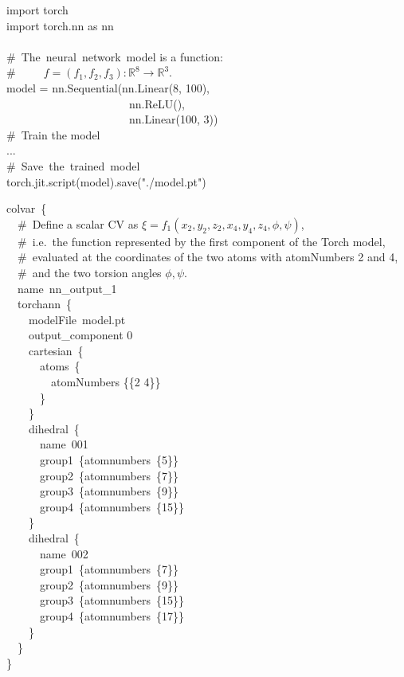 \begin{mdexampleinput}
\-import torch\\
\-import torch.nn as nn\\
\\
\-\#~The~neural~network~model is a function: \\
\-\#~~~~~$f=(f_1,f_2,f_3): \mathbb{R}^8\rightarrow \mathbb{R}^3$.\\
\-model = nn.Sequential(nn.Linear(8, 100), \\
\-~~~~~~~~~~~~~~~~~~~~~~nn.ReLU(), \\
\-~~~~~~~~~~~~~~~~~~~~~~nn.Linear(100, 3))\\
\#~Train the model\\
\-...\\
\#~Save~the~trained~model\\
\-torch.jit.script(model).save("./model.pt")
\end{mdexampleinput}

\begin{cvexampleinput}
\-colvar~\{\\
\-~~\#~Define a scalar CV as $\xi=f_1(x_2,y_2,z_2,x_4,y_4,z_4, \phi, \psi)$, \\
\-~~\#~i.e.~the function represented by the first component of the Torch model, \\
\-~~\#~evaluated at the coordinates of the two atoms with atomNumbers 2 and 4,\\
\-~~\#~and the two torsion angles $\phi,\psi$.\\
\-~~name~nn\_output\_1\\
\-~~torchann~\{\\
\-~~~~modelFile~model.pt\\
\-~~~~output\_component 0\\
\-~~~~cartesian~\{\\
\-~~~~~~atoms~\{\\
\-~~~~~~~~atomNumbers \{\{2 4\}\}\\
\-~~~~~~\}\\
\-~~~~\}\\ 
\-~~~~dihedral~\{\\
\-~~~~~~name~001\\
\-~~~~~~group1~\{atomnumbers~\{5\}\}\\
\-~~~~~~group2~\{atomnumbers~\{7\}\}\\
\-~~~~~~group3~\{atomnumbers~\{9\}\}\\
\-~~~~~~group4~\{atomnumbers~\{15\}\}\\
\-~~~~\}\\
\-~~~~dihedral~\{\\
\-~~~~~~name~002\\
\-~~~~~~group1~\{atomnumbers~\{7\}\}\\
\-~~~~~~group2~\{atomnumbers~\{9\}\}\\
\-~~~~~~group3~\{atomnumbers~\{15\}\}\\
\-~~~~~~group4~\{atomnumbers~\{17\}\}\\
\-~~~~\}\\
\-~~\}\\
\-\}
\end{cvexampleinput}

